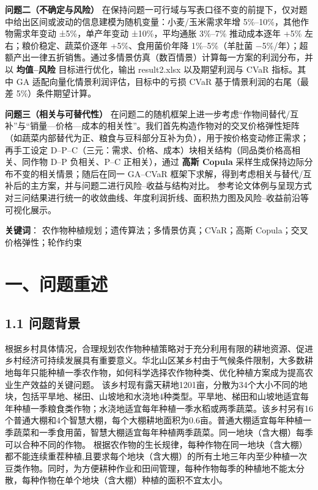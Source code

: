 \documentclass[12pt]{article}
\begin{document}
\textbf{问题二（不确定与风险）} 在保持问题一可行域与写表口径不变的前提下，仅对题中给出区间或波动的信息建模为随机变量：小麦/玉米需求年增 5\%–10\%，其他作物需求年变动 ±5\%，单产年变动 ±10\%，平均通胀 3\%–7\% 推动成本逐年 +5\% 左右；粮价稳定、蔬菜价逐年 +5\%、食用菌价年降 1\%–5\%（羊肚菌 −5\%/年）；超额产出一律五折销售。通过多情景仿真（数百情景）计算每一方案的利润分布，并以 \textbf{均值–风险} 目标进行优化，输出 result2.xlsx 以及期望利润与 CVaR 指标。其中 GA 适配向量化情景利润评估，目标中的亏损 CVaR 基于情景利润的右尾（最差 5\%）条件期望计算。

    \textbf{问题三（相关与可替代性）} 在问题二的随机框架上进一步考虑“作物间替代/互补”与“销量—价格—成本的相关性”。我们首先构造作物对的交叉价格弹性矩阵 （如蔬菜内部替代为正、粮食与豆科部分互补为负），用于按价格变动修正需求；再手工设定 D–P–C（三元：需求、价格、成本）块相关结构（同品类价格高相关、同作物 D–P 负相关、P–C 正相关），通过 \textbf{高斯 Copula} 采样生成保持边际分布不变的相关情景；随后在同一 GA–CVaR 框架下求解，得到考虑相关与替代/互补后的主方案，并与问题二进行风险–收益与结构对比。 参考论文体例与呈现方式对三问结果进行统一的收敛曲线、年度利润折线、面积热力图及风险–收益前沿等可视化展示。

\textbf{关键词}： 农作物种植规划；遗传算法；多情景仿真；CVaR；高斯 Copula；交叉价格弹性；轮作约束

\vspace*{1cm}

\newpage
\section{一、问题重述}
\subsection{1.1 问题背景}
根据乡村具体情况，合理规划农作物种植策略对于充分利用有限的耕地资源、促进乡村经济可持续发展具有重要意义。华北山区某乡村由于气候条件限制，大多数耕地每年只能种植一季农作物，如何科学选择农作物种类、优化种植方案成为提高农业生产效益的关键问题。
该乡村现有露天耕地1201亩，分散为34个大小不同的地块，包括平旱地、梯田、山坡地和水浇地4种类型。平旱地、梯田和山坡地适宜每年种植一季粮食类作物；水浇地适宜每年种植一季水稻或两季蔬菜。该乡村另有16个普通大棚和4个智慧大棚，每个大棚耕地面积为0.6亩。普通大棚适宜每年种植一季蔬菜和一季食用菌，智慧大棚适宜每年种植两季蔬菜。同一地块（含大棚）每季可以合种不同的作物。 
根据农作物的生长规律，每种作物在同一地块（含大棚）都不能连续重茬种植,且要求每个地块（含大棚）的所有土地三年内至少种植一次豆类作物。同时，为方便耕种作业和田间管理，每种作物每季的种植地不能太分散，每种作物在单个地块（含大棚）种植的面积不宜太小。 
\end{document}
